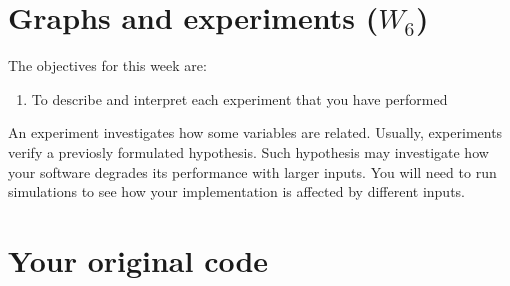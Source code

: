 \documentclass[a4paper,12pt]{report}
\begin{document}


\chapter{Graphs and experiments ($W_{6}$)}

The objectives for this week are:
\begin{enumerate}
 \item To describe and interpret each experiment that you have performed
\end{enumerate}

An experiment investigates how some variables are related. 
Usually, experiments verify a previosly formulated hypothesis.
Such hypothesis may investigate how your software degrades its performance with larger inputs.
You will need to run simulations to see how your implementation is affected by different inputs.




\appendix

\chapter{Your original code}
\label{app:code}


\end{document}
